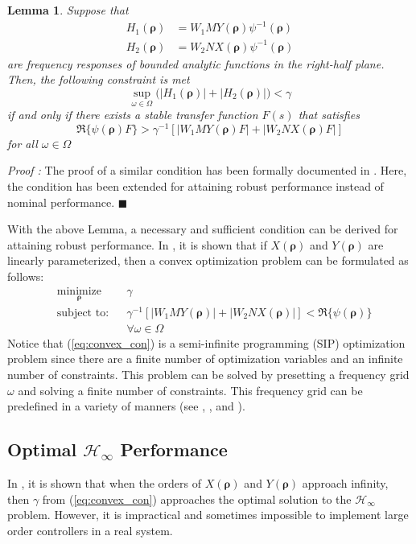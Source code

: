 \documentclass[letterpaper, 10 pt, conference]{ieeeconf}  %
\newtheorem{lemma}{Lemma}
\begin{document}
\begin{lemma}   \label{lem1}
Suppose that 
\begin{equation*}
\begin{aligned}
H_1(\bm{\rho}) &=W_1MY(\bm{\rho}) \psi^{-1}(\bm{\rho})\\   H_2(\bm{\rho}) &=W_2NX(\bm{\rho}) \psi^{-1}(\bm{\rho})
\end{aligned}
\end{equation*}
are frequency responses of bounded analytic functions in the right-half plane. Then, the following constraint is met
\begin{equation} \label{eq4}
\sup_{\omega \in \Omega}  \big(|H_1(\bm{\rho}) | + |H_2(\bm{\rho}) | \big) < \gamma
\end{equation}
if and only if there exists a stable transfer function $F(s)$ that satisfies
$$
\Re\{\psi(\bm{\rho})F\}>\gamma^{-1}\left[ |W_1MY(\bm{\rho})F| + |W_2 NX(\bm{\rho})F| \right]
$$
for all $\omega \in \Omega $
\end{lemma}
{\it Proof :} 
The proof of a similar condition has been formally documented in \cite{KNZ16}. Here, the condition has been extended for attaining robust performance instead of nominal performance.
{\hfill \ensuremath{\blacksquare}}

With the above Lemma, a necessary and sufficient condition can be derived for attaining robust performance. In \cite{KNZ16}, it is shown that if $X(\bm{\rho})$ and $Y(\bm{\rho})$ are linearly parameterized, then a convex optimization problem can be formulated as follows: 
\begin{equation} \label{eq:convex_con}
\begin{aligned}
& \underset{ \bm{\rho}}{\text{minimize}}
& & \gamma  \\
& \text{subject to:} & & \gamma^{-1} \left[  |W_1MY(\bm{\rho})| + |W_2 NX(\bm{\rho})| \right] < \Re\{\psi(\bm{\rho}) \}  \\ 
& & & \forall \omega \in \Omega \quad 
\end{aligned}
\end{equation}
Notice that (\ref{eq:convex_con}) is a semi-infinite programming (SIP) optimization problem since there are a finite number of optimization variables and an infinite number of constraints. This problem can be solved by presetting a frequency grid $\omega$ and solving a finite number of constraints. This frequency grid can be predefined in a variety of manners (see \cite{SVBB11}, \cite{GKL10b}, and \cite{FR05}).

\subsection{Optimal $\mathcal{H}_{\infty}$ Performance}
In \cite{KNZ16}, it is shown that when the orders of $X(\bm{\rho})$ and $Y(\bm{\rho})$ approach infinity, then $\gamma$ from (\ref{eq:convex_con}) approaches the optimal solution to the $\mathcal{H}_{\infty}$ problem. However, it is impractical and sometimes impossible to implement large order controllers in a real system.
\end{document}
